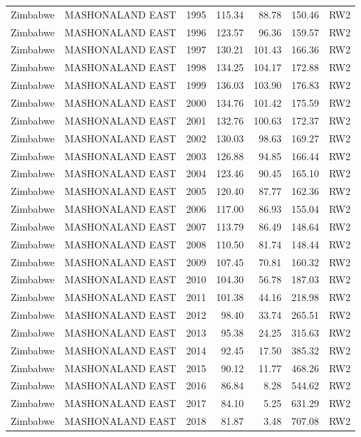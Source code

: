 \begin{longtable}{lllrrrl}
  Zimbabwe & MASHONALAND EAST & 1995 & 115.34 & 88.78 & 150.46 & RW2 \\ 
  Zimbabwe & MASHONALAND EAST & 1996 & 123.57 & 96.36 & 159.57 & RW2 \\ 
  Zimbabwe & MASHONALAND EAST & 1997 & 130.21 & 101.43 & 166.36 & RW2 \\ 
  Zimbabwe & MASHONALAND EAST & 1998 & 134.25 & 104.17 & 172.88 & RW2 \\ 
  Zimbabwe & MASHONALAND EAST & 1999 & 136.03 & 103.90 & 176.83 & RW2 \\ 
  Zimbabwe & MASHONALAND EAST & 2000 & 134.76 & 101.42 & 175.59 & RW2 \\ 
  Zimbabwe & MASHONALAND EAST & 2001 & 132.76 & 100.63 & 172.37 & RW2 \\ 
  Zimbabwe & MASHONALAND EAST & 2002 & 130.03 & 98.63 & 169.27 & RW2 \\ 
  Zimbabwe & MASHONALAND EAST & 2003 & 126.88 & 94.85 & 166.44 & RW2 \\ 
  Zimbabwe & MASHONALAND EAST & 2004 & 123.46 & 90.45 & 165.10 & RW2 \\ 
  Zimbabwe & MASHONALAND EAST & 2005 & 120.40 & 87.77 & 162.36 & RW2 \\ 
  Zimbabwe & MASHONALAND EAST & 2006 & 117.00 & 86.93 & 155.04 & RW2 \\ 
  Zimbabwe & MASHONALAND EAST & 2007 & 113.79 & 86.49 & 148.64 & RW2 \\ 
  Zimbabwe & MASHONALAND EAST & 2008 & 110.50 & 81.74 & 148.44 & RW2 \\ 
  Zimbabwe & MASHONALAND EAST & 2009 & 107.45 & 70.81 & 160.32 & RW2 \\ 
  Zimbabwe & MASHONALAND EAST & 2010 & 104.30 & 56.78 & 187.03 & RW2 \\ 
  Zimbabwe & MASHONALAND EAST & 2011 & 101.38 & 44.16 & 218.98 & RW2 \\ 
  Zimbabwe & MASHONALAND EAST & 2012 & 98.40 & 33.74 & 265.51 & RW2 \\ 
  Zimbabwe & MASHONALAND EAST & 2013 & 95.38 & 24.25 & 315.63 & RW2 \\ 
  Zimbabwe & MASHONALAND EAST & 2014 & 92.45 & 17.50 & 385.32 & RW2 \\ 
  Zimbabwe & MASHONALAND EAST & 2015 & 90.12 & 11.77 & 468.26 & RW2 \\ 
  Zimbabwe & MASHONALAND EAST & 2016 & 86.84 & 8.28 & 544.62 & RW2 \\ 
  Zimbabwe & MASHONALAND EAST & 2017 & 84.10 & 5.25 & 631.29 & RW2 \\ 
  Zimbabwe & MASHONALAND EAST & 2018 & 81.87 & 3.48 & 707.08 & RW2 \\ 

\end{longtable}
